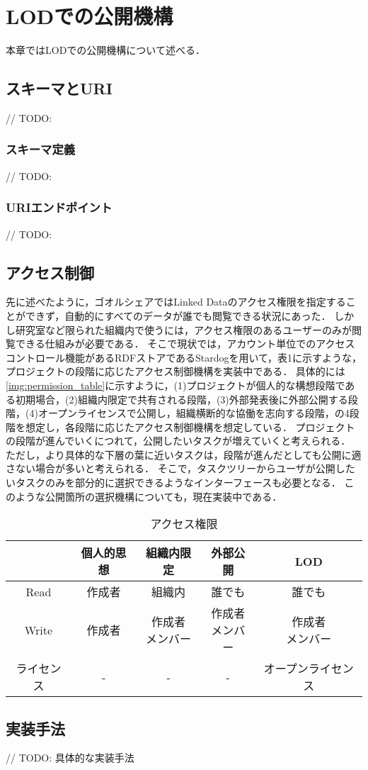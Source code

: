 \chapter{LODでの公開機構}
本章ではLODでの公開機構について述べる．

\section{スキーマとURI}
// TODO:

\subsection{スキーマ定義}
// TODO:

\subsection{URIエンドポイント}
// TODO:

\section{アクセス制御}
先に述べたように，ゴオルシェアではLinked Dataのアクセス権限を指定することができず，自動的にすべてのデータが誰でも閲覧できる状況にあった．
しかし研究室など限られた組織内で使うには，アクセス権限のあるユーザーのみが閲覧できる仕組みが必要である．
そこで現状では，アカウント単位でのアクセスコントロール機能があるRDFストアであるStardogを用いて，表1に示すような，プロジェクトの段階に応じたアクセス制御機構を実装中である．
具体的には\ref{img:permission_table}に示すように，(1)プロジェクトが個人的な構想段階である初期場合，(2)組織内限定で共有される段階，(3)外部発表後に外部公開する段階，(4)オープンライセンスで公開し，組織横断的な協働を志向する段階，の4段階を想定し，各段階に応じたアクセス制御機構を想定している．
プロジェクトの段階が進んでいくにつれて，公開したいタスクが増えていくと考えられる．
ただし，より具体的な下層の葉に近いタスクは，段階が進んだとしても公開に適さない場合が多いと考えられる．
そこで，タスクツリーからユーザが公開したいタスクのみを部分的に選択できるようなインターフェースも必要となる．
このような公開箇所の選択機構についても，現在実装中である．

\begin{table}[t]
 \caption{アクセス権限}
 \begin{center}
	 \begin{tabular}{ | c || c | c | c | c | } \hline
		  & 個人的思想 & 組織内限定 & 外部公開 & LOD \\ \hline \hline
			Read & 作成者 & 組織内 & 誰でも & 誰でも \\ \hline
			Write & 作成者 & \shortstack{ 作成者 \\ メンバー } & \shortstack{ 作成者 \\ メンバー } & \shortstack{ 作成者 \\ メンバー } \\ \hline
			ライセンス & - & - & - & オープンライセンス \\ \hline
	 \end{tabular}
	 \label{tab:convert}
 \end{center}
\end{table}

\section{実装手法}
// TODO: 具体的な実装手法
